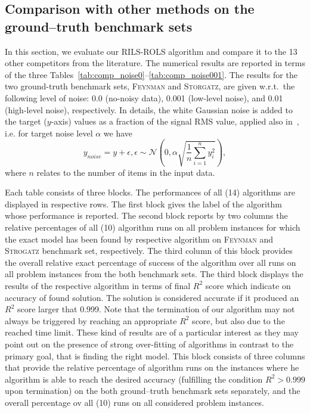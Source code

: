 \documentclass[a4paper,12pt]{elsarticle}
\begin{document}

\subsection{Comparison with other methods on the   ground--truth benchmark sets}
In this section, we evaluate our \textsc{RILS-ROLS} algorithm and compare it to the 13 other competitors from the literature. The numerical results are reported in terms of the three Tables~\ref{tab:comp_noise0}--\ref{tab:comp_noise001}. The results for the two ground-truth benchmark sets, \textsc{Feynman} and \textsc{Storgatz}, are given w.r.t.\   the following level of noise: 0.0 (no-noisy data), 0.001 (low-level noise), and 0.01 (high-level noise), respectively. In details, the white Gaussian noise is added to the target ($y$-axis) values as a fraction of the signal RMS value, applied also in~\cite{la2021contemporary}, i.e. for target noise level $\alpha$ we have
$$ y_{noise} = y + \epsilon, \epsilon \sim \mathcal{N}\left(0, \alpha \sqrt{\frac{1}{n} \sum _{i=1}^n{y_i^2}}\right),$$
where $n$ relates to the number of items in the input data.

Each table consists of three blocks. The performances of all (14) algorithms are displayed in respective rows.  
The first block gives the label of the algorithm  whose performance is reported. The second block reports by two columns the relative percentages of all (10) algorithm runs on all problem instances for which the exact model has been found by respective algorithm  on \textsc{Feynman} and \textsc{Strogatz} benchmark set, respectively. The third column of this block provides the overall   relative exact percentage of success of the algorithm over all runs on all problem instances from the both benchmark sets. The third block displays the results of the respective algorithm in terms of   final $R^2$ score which indicate  on accuracy of found solution. The solution is considered accurate if it     produced an $R^2$ score larger that  0.999.  Note that the termination of our algorithm may not always be triggered by reaching an appropriate $R^2$ score, but also due to the reached time limit. These kind of results are of a particular interest as they may point out on the presence of strong over-fitting of algorithms in contrast to the primary goal, that is finding the right model. This block consists of three columns that provide the relative percentage of algorithm runs on the instances where he algorithm is able to reach the desired accuracy (fulfilling the condition $R^2 > 0.999$ upon termination) on the both ground--truth benchmark sets separately, and the overall percentage ov all (10) runs on all considered problem instances.   %
\end{document}
